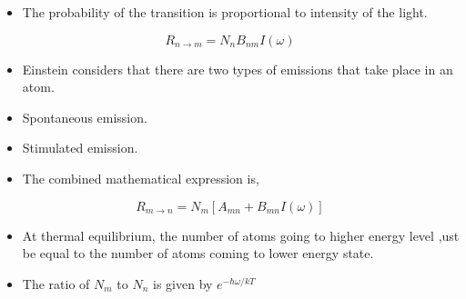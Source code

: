 \documentclass[aspectratio=169]{beamer}
\begin{document}
\begin{frame}

	\begin{itemize}

		\item The probability of the transition is proportional to intensity of the light. \newline
		
	\end{itemize}
		
			\begin{equation}
					 R_{n \to m} = N_{n} B_{nm} I(\omega) 	 
			\end{equation} 
						
\end{frame}

\begin{frame}{}

	\begin{itemize}

		\item Einstein considers that there are two types of emissions that take place in an atom. \newline
		\item Spontaneous emission. \newline
		\item Stimulated emission.
		
	\end{itemize}
	
\end{frame}

\begin{frame}{}

	\begin{itemize}
	
		\item The combined mathematical expression is,
		
	\end{itemize}
	
			\begin{equation}
					 R_{m \to n} = N_{m} [A_{mn} + B_{mn} I(\omega)] 
			\end{equation} 
	
\end{frame}

\begin{frame}{}

	\begin{itemize}

		\item At thermal equilibrium, the number of atoms going to higher energy level ,ust be equal to the number of atoms coming to 					  lower energy state. \newline	
		\item The ratio of $ N_{m} $ to $ N_{n} $ is given by $ e^{-\hbar \omega / kT} $  \newline
 
	\end{itemize}
	
\end{frame}
\end{document}
